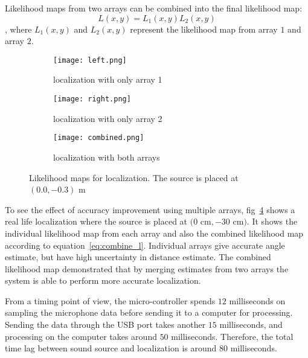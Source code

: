 Likelihood maps from two arrays can be combined into the final likelihood map:
\begin{equation}\label{eq:combine_l}
L(x,y) = L_1(x,y) L_2(x,y)
\end{equation}
, where $L_1(x,y)$ and $L_2(x,y)$ represent the likelihood map from array $1$ and array $2$.

\begin{figure}[]
  \centering
  \begin{subfigure}[]{.23\textwidth}
    \texttt{[image: left.png]}
    \caption{localization with only array 1}
    \label{fig:liklihood1}
  \end{subfigure}
  \begin{subfigure}[]{.23\textwidth}
    \texttt{[image: right.png]}
    \caption{localization with only array 2}
    \label{fig:liklihood2}
  \end{subfigure}
  \begin{subfigure}[]{.23\textwidth}
    \texttt{[image: combined.png]}
    \caption{localization with both arrays}
    \label{fig:liklihood3}
  \end{subfigure}
  \caption{Likelihood maps for localization. The source is placed at $(0.0,-0.3)$ m}
  \label{fig:liklihood}
\end{figure}

To see the effect of accuracy improvement using multiple arrays, fig~\ref{fig:liklihood} shows a real life localization where the source is placed at $(0$ cm$,-30$ cm$)$. It shows the individual likelihood map from each array and also the combined likelihood map according to equation~\ref{eq:combine_l}. Individual arrays give accurate angle estimate, but have high uncertainty in distance estimate. The combined likelihood map demonstrated that by merging estimates from two arrays the system is able to perform more accurate localization. 

From a timing point of view, the micro-controller spends $12$ milliseconds on sampling the microphone data before sending it to a computer for processing. Sending the data through the USB port takes another $15$ milliseconds, and processing on the computer takes around $50$ milliseconds. Therefore, the total time lag between sound source and localization is around $80$ milliseconds.
